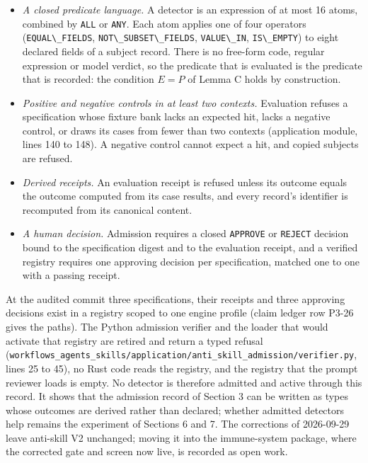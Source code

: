 \documentclass[
  11pt,
]{article}
\newcommand{\passthrough}[1]{#1}
\providecommand{\tightlist}{%
  \setlength{\itemsep}{0pt}\setlength{\parskip}{0pt}}
\begin{document}
\begin{itemize}
\tightlist
\item
  \emph{A closed predicate language.} A detector is an expression of at
  most 16 atoms, combined by \passthrough{\lstinline!ALL!} or
  \passthrough{\lstinline!ANY!}. Each atom applies one of four operators
  (\passthrough{\lstinline!EQUAL\_FIELDS!},
  \passthrough{\lstinline!NOT\_SUBSET\_FIELDS!},
  \passthrough{\lstinline!VALUE\_IN!},
  \passthrough{\lstinline!IS\_EMPTY!}) to eight declared fields of a
  subject record. There is no free-form code, regular expression or
  model verdict, so the predicate that is evaluated is the predicate
  that is recorded: the condition \(E = P\) of Lemma C holds by
  construction.
\item
  \emph{Positive and negative controls in at least two contexts.}
  Evaluation refuses a specification whose fixture bank lacks an
  expected hit, lacks a negative control, or draws its cases from fewer
  than two contexts (application module, lines 140 to 148). A negative
  control cannot expect a hit, and copied subjects are refused.
\item
  \emph{Derived receipts.} An evaluation receipt is refused unless its
  outcome equals the outcome computed from its case results, and every
  record's identifier is recomputed from its canonical content.
\item
  \emph{A human decision.} Admission requires a closed
  \passthrough{\lstinline!APPROVE!} or \passthrough{\lstinline!REJECT!}
  decision bound to the specification digest and to the evaluation
  receipt, and a verified registry requires one approving decision per
  specification, matched one to one with a passing receipt.
\end{itemize}

At the audited commit three specifications, their receipts and three
approving decisions exist in a registry scoped to one engine profile
(claim ledger row P3-26 gives the paths). The Python admission verifier
and the loader that would activate that registry are retired and return
a typed refusal
(\nolinkurl{workflows_agents_skills/application/anti_skill_admission/verifier.py},
lines 25 to 45), no Rust code reads the registry, and the registry that
the prompt reviewer loads is empty. No detector is therefore admitted
and active through this record. It shows that the admission record of
Section 3 can be written as types whose outcomes are derived rather than
declared; whether admitted detectors help remains the experiment of
Sections 6 and 7. The corrections of 2026-09-29 leave anti-skill V2
unchanged; moving it into the immune-system package, where the corrected
gate and screen now live, is recorded as open work.
\end{document}

